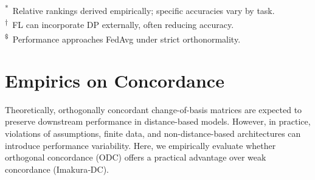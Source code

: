 \documentclass[final,3p,times]{elsarticle}
\theoremstyle{plain}
\begin{document}
\begin{table}[ht]
    \centering
    \caption{Qualitative comparison of representative PPML frameworks.}
    \label{tab:ppml_compare}
    
    \vspace{0.5ex}
    \raggedright
    \textsuperscript{*}\, Relative rankings derived empirically; specific accuracies vary by task.\\
    \textsuperscript{†}\, FL can incorporate DP externally, often reducing accuracy. \\
    \textsuperscript{\$}\, Performance approaches FedAvg under strict orthonormality.
\end{table}




\section{Empirics on Concordance}\label{sec: concordance evaluation}

Theoretically, orthogonally concordant change-of-basis matrices are expected to preserve downstream performance in distance-based models. However, in practice, violations of assumptions, finite data, and non-distance-based architectures can introduce performance variability. Here, we empirically evaluate whether orthogonal concordance (ODC) offers a practical advantage over weak concordance (Imakura‑DC).
\end{document}
